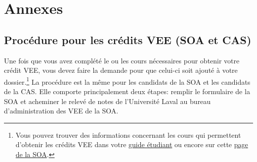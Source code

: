 \section*{Annexes}
\label{sec:annexes}
\subsection*{Procédure pour les crédits VEE (SOA et CAS)}
\label{subsec:vee}
Une fois que vous avez complété le ou les cours nécessaires pour obtenir votre crédit VEE, vous devez faire la demande pour que celui-ci soit ajouté à votre dossier.\footnote{Vous pouvez trouver des informations concernant les cours qui permettent d'obtenir les crédits VEE dans votre \href{https://www.act.ulaval.ca/programmes-et-cours/premier-cycle/guide-de-letudiant/}{guide étudiant} ou encore sur cette \href{https://soa.org/Education/Exam-Req/Instructions-for-VEE-Directory.aspx}{page de la SOA}.} La procédure est la même pour les candidats de la SOA et les candidats de la CAS. Elle comporte principalement deux étapes: remplir le formulaire de la SOA et acheminer le relevé de notes de l'Université Laval au bureau d'administration des VEE de la SOA.\vspace{\baselineskip} 

